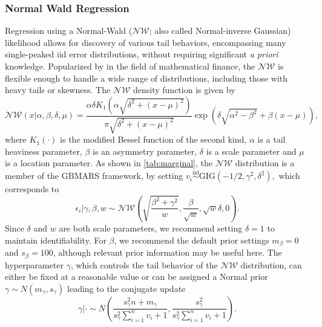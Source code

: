 \documentclass{article} %
\newcommand{\NIG}{\mathcal{NW}}
\begin{document}
\subsubsection{Normal Wald Regression}
Regression using a Normal-Wald ($\NIG$; also called Normal-inverse Gaussian) likelihood allows for discovery of various tail behaviors, encompassing many single-peaked iid error distributions, without requiring significant \textit{a priori} knowledge. Popularized by \cite{barndorff1997normal} in the field of mathematical finance, the $\NIG$ is flexible enough to handle a wide range of distributions, including those with heavy tails or skewness. The $\NIG$ density function is given by
\begin{equation}
    \label{eq:NIG}
    \NIG(x | \alpha, \beta, \delta, \mu) = \frac{\alpha\delta K_1\left(\alpha\sqrt{\delta^2 + (x-\mu)^2}\right)}{\pi\sqrt{\delta^2+(x-\mu)^2}}\exp\left(\delta\sqrt{\alpha^2-\beta^2}+\beta(x-\mu)\right),
\end{equation}
where $K_1(\cdot)$ is the modified Bessel function of the second kind, $\alpha$ is a tail heaviness parameter, $\beta$ is an asymmetry parameter, $\delta$ is a scale parameter and $\mu$ is a location parameter. As shown in \cref{tab:marginal}, the $\NIG$ distribution is a member of the GBMARS framework, by setting
$v_i \stackrel{\text{iid}}{\sim} \text{GIG}\left(-1/2, \gamma^2, \delta^2 \right),$
which corresponds to 
\begin{equation}
\epsilon_i|\gamma,\beta,w \sim \NIG\left(\sqrt{\frac{\beta^2+\gamma^2}{w}}, \frac{\beta}{\sqrt w},  \sqrt w\delta,0\right).    
\end{equation}
Since $\delta$ and $w$ are both scale parameters, we recommend setting $\delta = 1$ to maintain identifiability. For $\beta$, we recommend the default prior settings $m_\beta = 0$ and $s_\beta = 100$, although relevant prior information may be useful here. The hyperparameter $\gamma$, which controls the tail behavior of the $\NIG$ distribution, can either be fixed at a reasonable value or can be assigned a Normal prior $\gamma \sim N(m_\gamma, s_\gamma)$ leading to the conjugate update 
\begin{equation}
    \gamma|\cdot \sim N\left(\frac{s_\gamma^2 n + m_\gamma}{s_\gamma^2\sum_{i=1}^nv_i + 1}, \frac{s_\gamma^2}{s_\gamma^2\sum_{i=1}^nv_i + 1}\right).
\end{equation}
\end{document}
